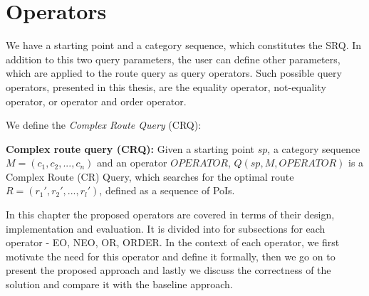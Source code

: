 \chapter{Operators} 
\label{sec:operators}

We have a starting point and a category sequence, which constitutes the SRQ. In addition to this two query parameters, the user can define other parameters, which are applied to the route query as query operators. Such possible query operators, presented in this thesis, are the equality operator, not-equality operator, or operator and order operator. 

We define the \textit{Complex Route Query} (CRQ):

\textbf{Complex route query (CRQ):} Given a starting point $sp$, a category sequence $M = (c_1, c_2, ..., c_n)$ and an operator $OPERATOR$, $Q(sp, M, OPERATOR)$ is a Complex Route (CR) Query, which searches for the optimal route $R = (r_1', r_2', ..., r_l')$, defined as a sequence of PoIs.

In this chapter the proposed operators are covered in terms of their design, implementation and evaluation. It is divided into for subsections for each operator - EO, NEO, OR, ORDER. In the context of each operator, we first motivate the need for this operator and define it formally, then we go on to present the proposed approach and lastly we discuss the correctness of the solution and compare it with the baseline approach.